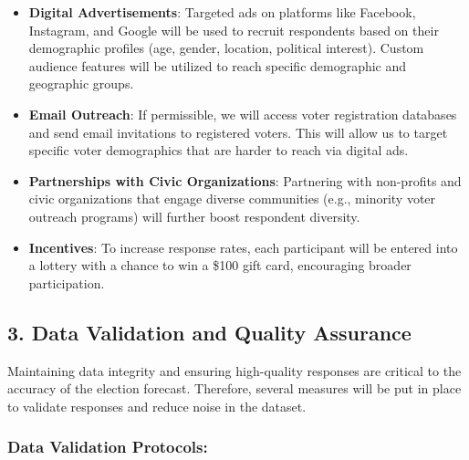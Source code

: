 \documentclass[
  letterpaper,
  DIV=11,
  numbers=noendperiod]{scrartcl}
\providecommand{\tightlist}{%
  \setlength{\itemsep}{0pt}\setlength{\parskip}{0pt}}\usepackage{longtable,booktabs,array}
\begin{document}
\begin{itemize}
\tightlist
\item
  \textbf{Digital Advertisements}: Targeted ads on platforms like
  Facebook, Instagram, and Google will be used to recruit respondents
  based on their demographic profiles (age, gender, location, political
  interest). Custom audience features will be utilized to reach specific
  demographic and geographic groups.
\item
  \textbf{Email Outreach}: If permissible, we will access voter
  registration databases and send email invitations to registered
  voters. This will allow us to target specific voter demographics that
  are harder to reach via digital ads.
\item
  \textbf{Partnerships with Civic Organizations}: Partnering with
  non-profits and civic organizations that engage diverse communities
  (e.g., minority voter outreach programs) will further boost respondent
  diversity.
\item
  \textbf{Incentives}: To increase response rates, each participant will
  be entered into a lottery with a chance to win a \$100 gift card,
  encouraging broader participation.
\end{itemize}

\subsection{\texorpdfstring{\textbf{3. Data Validation and Quality
Assurance}}{3. Data Validation and Quality Assurance}}\label{data-validation-and-quality-assurance}

Maintaining data integrity and ensuring high-quality responses are
critical to the accuracy of the election forecast. Therefore, several
measures will be put in place to validate responses and reduce noise in
the dataset.

\subsubsection{\texorpdfstring{\textbf{Data Validation
Protocols}:}{Data Validation Protocols:}}\label{data-validation-protocols}
\end{document}
